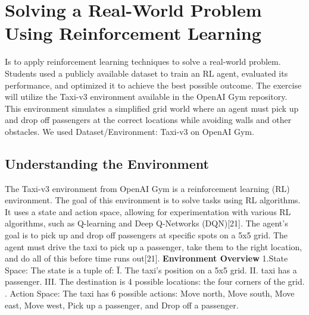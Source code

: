 \section{Solving a Real-World Problem Using Reinforcement Learning}
Is to apply reinforcement learning techniques to solve a real-world problem. Students used a publicly available dataset to train an RL agent, evaluated its performance, and optimized it to achieve the best possible outcome.
\newline
The exercise will utilize the Taxi-v3 environment available in the OpenAI Gym repository. This environment simulates a simplified grid world where an agent must pick up and drop off passengers at the correct locations while avoiding walls and other obstacles. We used Dataset/Environment: Taxi-v3 on OpenAI Gym.
\newline
\subsection{Understanding the Environment}
The Taxi-v3 environment from OpenAI Gym is a reinforcement learning (RL) environment. The goal of this environment is to solve tasks using RL algorithms. It uses a state and action space, allowing for experimentation with various RL algorithms, such as Q-learning and Deep Q-Networks (DQN)[21].
\newline
The agent's goal is to pick up and drop off passengers at specific spots on a 5x5 grid. The agent must drive the taxi to pick up a passenger, take them to the right location, and do all of this before time runs out[21].
\newline
\newline
\textbf{Environment Overview}
\newline
\newline 1.State Space: The state is a tuple of:
Ï. The taxi's position on a 5x5 grid.
II. taxi has a passenger. 
III. The destination is 4 possible locations: the four corners of the grid.
. Action Space: The taxi has 6 possible actions:
Move north, Move south, Move east, Move west, Pick up a passenger, and Drop off a passenger.
\newline
